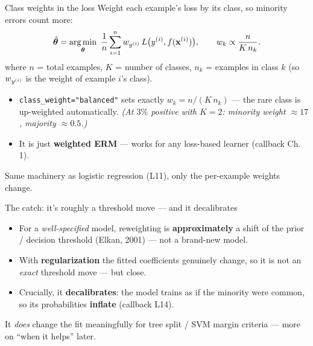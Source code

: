 \documentclass[aspectratio=169]{beamer}
\begin{document}
\begin{frame}{Class weights in the loss}
  Weight each example's loss by its class, so minority errors count more:
  \[
    \hat{\bm{\theta}} = \mathop{\mathrm{arg\,min}}_{\bm{\theta}} \ \frac1n \sum_{i=1}^{n} w_{y^{(i)}}\, L\big(y^{(i)}, f(\mathbf{x}^{(i)})\big),
    \qquad w_k \propto \frac{n}{K\, n_k}.
  \]
  where $n$ = total examples, $K$ = number of classes, $n_k$ = examples in class $k$
  (so $w_{y^{(i)}}$ is the weight of example $i$'s class).
  \begin{itemize}\small
    \item \texttt{class\_weight="balanced"} sets exactly $w_k = n/(K\,n_k)$ --- the rare class is
      up-weighted automatically. \emph{(At $3\%$ positive with $K{=}2$: minority weight
      $\approx 17$, majority $\approx 0.5$.)}
    \item It is just \textbf{weighted ERM} --- works for any loss-based learner (callback Ch.\,1).
  \end{itemize}
  \vfill
  \footnotesize Same machinery as logistic regression (L11), only the per-example weights change.
\end{frame}

\begin{frame}{The catch: it's roughly a threshold move --- and it decalibrates}
  \begin{itemize}\small
    \item For a \emph{well-specified} model, reweighting is \textbf{approximately} a shift of the
      prior / decision threshold (Elkan, 2001) --- not a brand-new model.
    \item With \textbf{regularization} the fitted coefficients genuinely change, so it is not an
      \emph{exact} threshold move --- but close.
    \item Crucially, it \textbf{decalibrates}: the model trains as if the minority were common, so
      its probabilities \textbf{inflate} (callback L14).
  \end{itemize}
  \vfill
  \vskip 3pt
  \footnotesize It \emph{does} change the fit meaningfully for tree split / SVM margin criteria --- more on ``when it helps'' later.
\end{frame}
\end{document}
